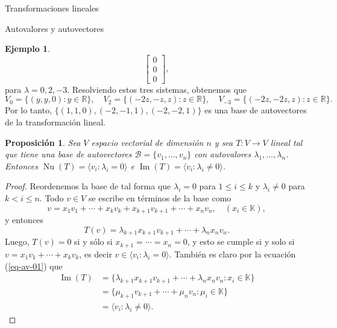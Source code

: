 \documentclass[a4paper,12pt,twoside,spanish,reqno]{amsbook}
\newtheorem{proposicion}[teorema]{Proposici\'on}
\theoremstyle{definition}
\newtheorem{ejemplo}{Ejemplo}[section]
\theoremstyle{remark}
\newcommand{\img}{\operatorname{Im}}
\newcommand{\nuc}{\operatorname{Nu}}
\newcommand{\R}{\mathbb R}
\newcommand{\K}{\mathbb K}
\begin{document}
\begin{chapter}{Transformaciones lineales}
\begin{section}{Autovalores y autovectores}
\begin{ejemplo}
\begin{equation*}
		\begin{bmatrix} 0\\0 \\0\end{bmatrix},
		\end{equation*}  
		para $\lambda =0, 2,-3$. Resolviendo estos tres sistemas, obtenemos que 
		\begin{equation*}
			V_0 = \{(y,y,0): y \in \R \},\quad V_2 = \{(-2z,-z,z): z \in \R \},\quad V_{-3} = \{(-2z,-2z,z): z \in \R \}. 
		\end{equation*}
		Por lo tanto, $\{(1,1,0), (-2,-1,1), (-2,-2,1)\}$ es una base de autovectores de la transformación lineal. 
		\end{ejemplo}
		
		\begin{proposicion} Sea $V$ espacio vectorial de dimensión $n$ y sea $T: V \to V$ lineal tal que tiene una base de autovectores $\mathcal{B} = \{v_1,\ldots,v_n \}$  con autovalores $\lambda_1,\ldots,\lambda_n$. Entonces $\nuc(T)=\langle v_i: \lambda_i =0 \rangle$ e  $\img(T)=\langle v_i: \lambda_i \not=0 \rangle$.			
		\end{proposicion}
		\begin{proof} Reordenemos la base de tal forma que  $\lambda_i =0$ para $1 \le i \le k$ y $\lambda_i \ne 0$ para $k < i \le n$. 
		Todo $v \in V$ se escribe en términos de la base como 
		$$
		v = x_1v_1 + \cdots+ x_k v_k+ x_{k+1} v_{k+1}+\cdots+ x_n v_n,\quad (x_i \in \K),
		$$
		y entonces
		\begin{equation}\label{eq-av-01}
			T(v) =  \lambda_{k+1}x_{k+1} v_{k+1}+\cdots+ \lambda_nx_n v_n.
		\end{equation}
		Luego, $T(v) =0$ si y sólo si $x_{k+1} = \cdots = x_n=0$, y esto se cumple si y solo si $v =  x_1v_1 + \cdots+ x_k v_k$,  es decir $v \in \langle v_i: \lambda_i =0 \rangle$. 
		También es claro por la ecuación (\ref{eq-av-01}) que 
		\begin{align*}
			\img(T) &= \{\lambda_{k+1}x_{k+1} v_{k+1}+\cdots+ \lambda_nx_n v_n: x_i \in \K \} \\
			&=\{\mu_{k+1} v_{k+1}+\cdots+ \mu_n v_n: \mu_i \in \K \}\\
			&= \langle v_i: \lambda_i \not=0 \rangle.
		\end{align*}
		\end{proof}
		

\end{section}
\end{chapter}
\end{document}

